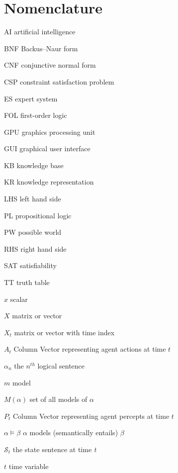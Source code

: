 \chapter{Nomenclature}
\label{nomenclature}

\begin{Nomencl}[4em]
	
	\item[AI] artificial intelligence
	\item[BNF] Backus–Naur form  
	\item[CNF] conjunctive normal form
	\item[CSP] constraint satisfaction problem
	\item[ES] expert system 	
	\item[FOL] first-order logic
	\item[GPU] graphics processing unit
	\item[GUI] graphical user interface
    \item[KB] knowledge base
    \item[KR] knowledge representation
    \item[LHS] left hand side
    \item[PL] propositional logic
    \item[PW] possible world
    \item[RHS] right hand side
    \item[SAT] satisfiability
    \item[TT] truth table
    
   
	\item[$x$] scalar
	\item[${X}$] matrix or vector
   	\item[${X}_t$] matrix or vector with time index 



   
  	 \item[${A}_t$] Column Vector representing agent actions at time $t$
   	\item[$\alpha_n$]  the $n^{th}$ logical sentence
   	\item[$m$]  model
   	\item[$M(\alpha)$]  set of all models of $\alpha$
	\item[${P}_t$] Column Vector representing agent percepts at time $t$  
   	\item[$\alpha \models \beta$]  $\alpha$ models (semantically entails) $\beta$
   	\item[$\mathcal{S}_t$] the state sentence at time \textit{t}
   	\item[$t$] time variable



\end{Nomencl}


\endinput
